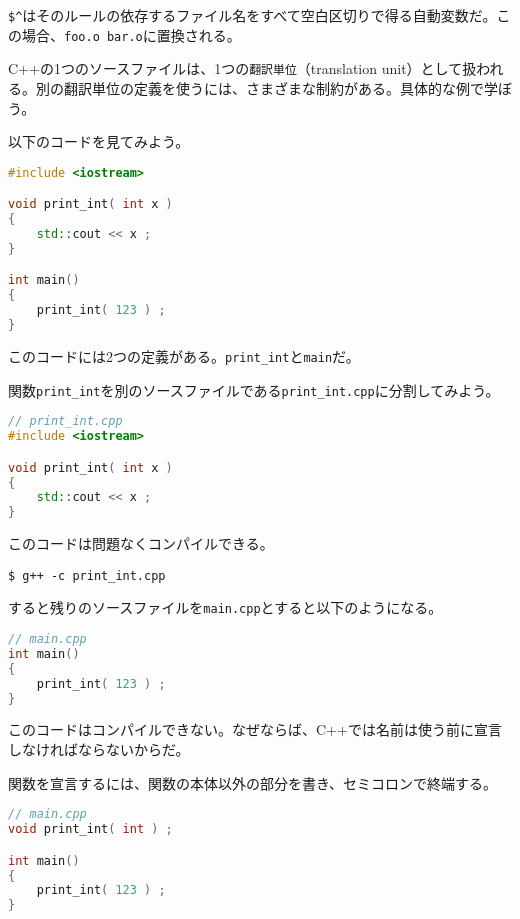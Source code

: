 \texttt{\${\textasciicircum}}はそのルールの依存するファイル名をすべて空白区切りで得る自動変数だ。この場合、\texttt{foo.o bar.o}に置換される。


C++の1つのソースファイルは、1つの\texttt{翻訳単位}（translation unit）として扱われる。別の翻訳単位の定義を使うには、さまざまな制約がある。具体的な例で学ぼう。


以下のコードを見てみよう。

\begin{lstlisting}[language={C++}]
#include <iostream>

void print_int( int x )
{
    std::cout << x ;    
}

int main()
{
    print_int( 123 ) ;
}
\end{lstlisting}

このコードには2つの定義がある。\texttt{print\_int}と\texttt{main}だ。

関数\texttt{print\_int}を別のソースファイルである\texttt{print\_int.cpp}に分割してみよう。

\begin{lstlisting}[language={C++}]
// print_int.cpp
#include <iostream>

void print_int( int x )
{
    std::cout << x ;    
}
\end{lstlisting}

このコードは問題なくコンパイルできる。

\begin{lstlisting}[style=terminal]
$ g++ -c print_int.cpp
\end{lstlisting}

すると残りのソースファイルを\texttt{main.cpp}とすると以下のようになる。

\begin{lstlisting}[language={C++}]
// main.cpp
int main()
{
    print_int( 123 ) ;
}
\end{lstlisting}

このコードはコンパイルできない。なぜならば、C++では名前は使う前に宣言しなければならないからだ。

関数を宣言するには、関数の本体以外の部分を書き、セミコロンで終端する。

\begin{lstlisting}[language={C++}]
// main.cpp
void print_int( int ) ;

int main()
{
    print_int( 123 ) ;
}
\end{lstlisting}

